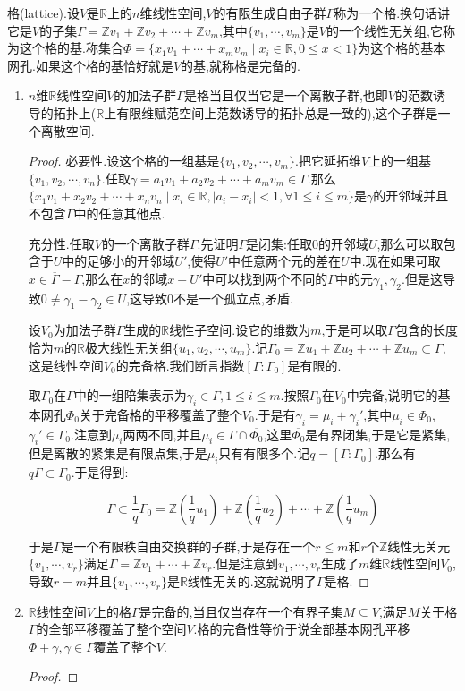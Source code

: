 格(lattice).设$V$是$\mathbb{R}$上的$n$维线性空间,$V$的有限生成自由子群$\Gamma$称为一个格.换句话讲它是$V$的子集$\Gamma=\mathbb{Z}v_1+\mathbb{Z}v_2+\cdots+\mathbb{Z}v_m$,其中$\{v_1,\cdots,v_m\}$是$V$的一个线性无关组,它称为这个格的基.称集合$\Phi=\{x_1v_1+\cdots+x_mv_m\mid x_i\in\mathbb{R},0\le x<1\}$为这个格的基本网孔.如果这个格的基恰好就是$V$的基,就称格是完备的.
\begin{enumerate}
	\item $n$维$\mathbb{R}$线性空间$V$的加法子群$\Gamma$是格当且仅当它是一个离散子群,也即$V$的范数诱导的拓扑上($\mathbb{R}$上有限维赋范空间上范数诱导的拓扑总是一致的),这个子群是一个离散空间.
	\begin{proof}
		
		必要性.设这个格的一组基是$\{v_1,v_2,\cdots,v_m\}$.把它延拓维$V$上的一组基$\{v_1,v_2,\cdots,v_n\}$.任取$\gamma=a_1v_1+a_2v_2+\cdots+a_mv_m\in\Gamma$.那么$\{x_1v_1+x_2v_2+\cdots+x_nv_n\mid x_i\in\mathbb{R},|a_i-x_i|<1,\forall 1\le i\le m\}$是$\gamma$的开邻域并且不包含$\Gamma$中的任意其他点.
		
		充分性.任取$V$的一个离散子群$\Gamma$.先证明$\Gamma$是闭集:任取0的开邻域$U$,那么可以取包含于$U$中的足够小的开邻域$U'$,使得$U'$中任意两个元的差在$U$中.现在如果可取$x\in\overline{\Gamma}-\Gamma$,那么在$x$的邻域$x+U'$中可以找到两个不同的$\Gamma$中的元$\gamma_1,\gamma_2$.但是这导致$0\not=\gamma_1-\gamma_2\in U$,这导致0不是一个孤立点,矛盾.
		
		设$V_0$为加法子群$\Gamma$生成的$\mathbb{R}$线性子空间.设它的维数为$m$,于是可以取$\Gamma$包含的长度恰为$m$的$\mathbb{R}$极大线性无关组$\{u_1,u_2,\cdots,u_m\}$.记$\Gamma_0=\mathbb{Z}u_1+\mathbb{Z}u_2+\cdots+\mathbb{Z}u_m\subset\Gamma$,这是线性空间$V_0$的完备格.我们断言指数$[\Gamma:\Gamma_0]$是有限的.
		
		取$\Gamma_0$在$\Gamma$中的一组陪集表示为$\gamma_i\in\Gamma,1\le i\le m$.按照$\Gamma_0$在$V_0$中完备,说明它的基本网孔$\Phi_0$关于完备格的平移覆盖了整个$V_0$.于是有$\gamma_i=\mu_i+\gamma_i'$,其中$\mu_i\in\Phi_0$,$\gamma_i'\in\Gamma_0$.注意到$\mu_i$两两不同,并且$\mu_i\in\Gamma\cap\overline{\Phi_0}$,这里$\overline{\Phi_0}$是有界闭集,于是它是紧集,但是离散的紧集是有限点集,于是$\mu_i$只有有限多个.记$q=[\Gamma:\Gamma_0]$.那么有$q\Gamma\subset\Gamma_0$.于是得到:
		
		$$\Gamma\subset\frac{1} {q}\Gamma_0=\mathbb{Z}\left(\frac{1}{q}u_1\right)+\mathbb{Z}\left(\frac{1}{q}u_2\right)+\cdots+\mathbb{Z}\left(\frac{1}{q}u_m\right)$$
		
		于是$\Gamma$是一个有限秩自由交换群的子群,于是存在一个$r\le m$和$r$个$\mathbb{Z}$线性无关元$\{v_1,\cdots,v_r\}$满足$\Gamma=\mathbb{Z}v_1+\cdots+\mathbb{Z}v_r$.但是注意到$v_1,\cdots,v_r$生成了$m$维$\mathbb{R}$线性空间$V_0$,导致$r=m$并且$\{v_1,\cdots,v_r\}$是$\mathbb{R}$线性无关的.这就说明了$\Gamma$是格.
	\end{proof}
    \item $\mathbb{R}$线性空间$V$上的格$\Gamma$是完备的,当且仅当存在一个有界子集$M\subseteq V$,满足$M$关于格$\Gamma$的全部平移覆盖了整个空间$V$.格的完备性等价于说全部基本网孔平移$\Phi+\gamma,\gamma\in\Gamma$覆盖了整个$V$.
    \begin{proof}
    	

\end{proof}
\end{enumerate}
